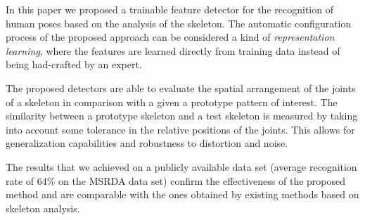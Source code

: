\documentclass[runningheads,a4paper]{llncs}
\begin{document}
In this paper we proposed a trainable feature detector for the recognition of human poses based on the analysis of the skeleton.   
The automatic configuration process of the proposed approach can be considered a kind of \emph{representation learning}, where the features are learned directly from training data instead of being had-crafted by an expert. 

The proposed detectors are able to evaluate the spatial arrangement of the joints of a skeleton in comparison with a given a prototype pattern of interest. The similarity between a prototype skeleton and a test skeleton is measured by taking into account some tolerance in the relative positions of the joints. This allows for generalization capabilities and robustness to distortion and noise.

The results that we achieved on a publicly available data set (average recognition rate of $64\%$ on the MSRDA data set) confirm the effectiveness of the proposed method and are comparable with the ones obtained by existing methods based on skeleton analysis.




\end{document}
